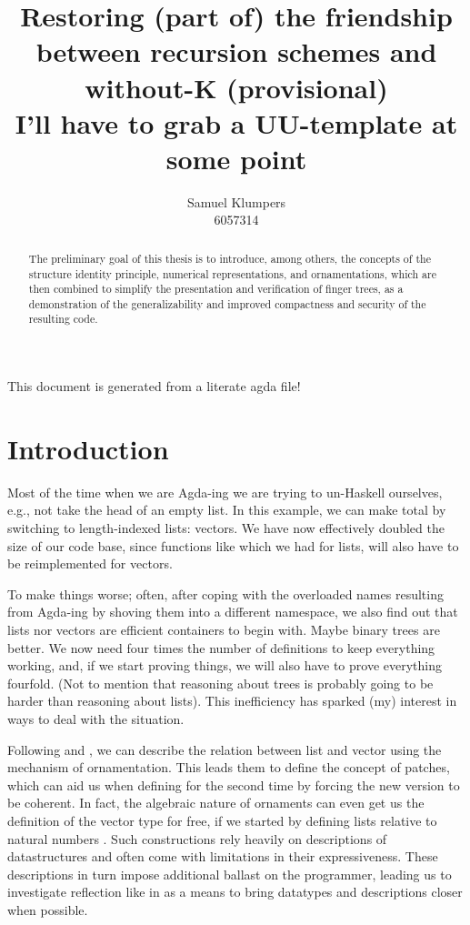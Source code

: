 \documentclass{article}
\title{Restoring (part of) the friendship between recursion schemes and without-K (provisional)\\ \small I'll have to grab a UU-template at some point}
\author{Samuel Klumpers\\6057314}
\theoremstyle{plain}%
\theoremstyle{definition}
\begin{document}
\maketitle
\tableofcontents

This document is generated from a literate agda file!
\newpage

\begin{abstract}
    The preliminary goal of this thesis is to introduce, among others, the concepts of the structure identity principle, numerical representations, and ornamentations, which are then combined to simplify the presentation and verification of finger trees, as a demonstration of the generalizability and improved compactness and security of the resulting code. 
\end{abstract}

\section{Introduction}\label{sec:intro}
Most of the time when we are Agda-ing \cite{agda} we are trying to un-Haskell ourselves, e.g., not take the head of an empty list. In this example, we can make  total by switching to length-indexed lists: vectors. We have now effectively doubled the size of our code base, since functions like \AgdaFunction{\_++\_} which we had for lists, will also have to be reimplemented for vectors.

To make things worse; often, after coping with the overloaded names resulting from Agda-ing by shoving them into a different namespace, we also find out that lists nor vectors are efficient containers to begin with. Maybe binary trees are better. We now need four times the number of definitions to keep everything working, and, if we start proving things, we will also have to prove everything fourfold. (Not to mention that reasoning about trees is probably going to be harder than reasoning about lists).  This inefficiency has sparked (my) interest in ways to deal with the situation.

Following \cite{orntrans} and \cite{progorn}, we can describe the relation between list and vector using the mechanism of ornamentation. This leads them to define the concept of patches, which can aid us when defining \AgdaFunction{\_++\_} for the second time by forcing the new version to be coherent. In fact, the algebraic nature of ornaments can even get us the definition of the vector type for free, if we started by defining lists relative to natural numbers \cite{algorn}. Such constructions rely heavily on descriptions of datastructures and often come with limitations in their expressiveness. These descriptions in turn impose additional ballast on the programmer, leading us to investigate reflection like in \cite{practgen} as a means to bring datatypes and descriptions closer when possible.
\end{document}
